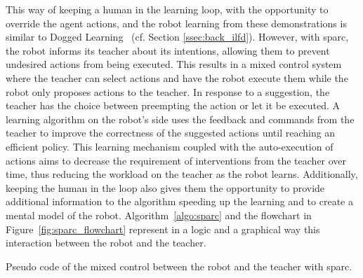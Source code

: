 This way of keeping a human in the learning loop, with the opportunity to override the agent actions, and the robot learning from these demonstrations is similar to Dogged Learning~\citep{grollman2007dogged} (cf. Section \ref{ssec:back_ilfd}). However, with \gls{sparc}, the robot informs its teacher about its intentions, allowing them to prevent undesired actions from being executed. This results in a mixed control system where the teacher can select actions and have the robot execute them while the robot only proposes actions to the teacher. In response to a suggestion, the teacher has the choice between preempting the action or let it be executed. A learning algorithm on the robot's side uses the feedback and commands from the teacher to improve the correctness of the suggested actions until reaching an efficient policy. This learning mechanism coupled with the auto-execution of actions aims to decrease the requirement of interventions from the teacher over time, thus reducing the workload on the teacher as the robot learns. Additionally, keeping the human in the loop also gives them the opportunity to provide additional information to the algorithm speeding up the learning and to create a mental model of the robot. Algorithm~\ref{algo:sparc} and the flowchart in Figure~\ref{fig:sparc_flowchart} represent in a logic and a graphical way this interaction between the robot and the teacher.

\begin{algorithm}
	\DontPrintSemicolon

	\caption{Pseudo code of the mixed control between the robot and the teacher with \gls{sparc}.}
	\label{algo:sparc}
\end{algorithm}

